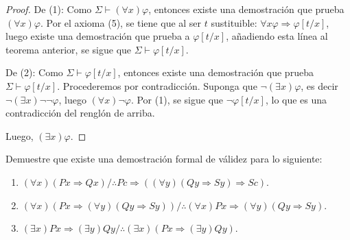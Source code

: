 \documentclass[12pt]{report}
\theoremstyle{largebreak}
\begin{document}
    \begin{proof}
        De (1): Como $\Sigma\vdash(\forall x)\varphi$, entonces existe una demostración que prueba $(\forall x)\varphi$. Por el axioma (5), se tiene que al ser $t$ sustituible: $\forall x\varphi\Rightarrow\varphi\left[t/x \right]$, luego existe una demostración que prueba a $\varphi\left[t/x \right]$, añadiendo esta línea al teorema anterior, se sigue que $\Sigma\vdash\varphi\left[t/x \right]$.

        De (2): Como $\Sigma\vdash\varphi[t/x]$, entonces existe una demostración que prueba $\Sigma\vdash\varphi[t/x]$. Procederemos por contradicción. Suponga que $\neg(\exists x)\varphi$, es decir $\neg(\exists x)\neg\neg\varphi$, luego $(\forall x)\neg\varphi$. Por (1), se sigue que $\neg\varphi[t/x]$, lo que es una contradicción del renglón de arriba.

        Luego, $(\exists x)\varphi$.
    \end{proof}

    \begin{excer}
        Demuestre que existe una demostración formal de válidez para lo siguiente:
        \begin{enumerate}
            \item $(\forall x)(Px\Rightarrow Qx)/\therefore Pc\Rightarrow((\forall y)(Qy\Rightarrow Sy)\Rightarrow Sc)$.
            \item $(\forall x)(Px\Rightarrow(\forall y)(Qy\Rightarrow Sy))/\therefore (\forall x)Px\Rightarrow(\forall y)(Qy\Rightarrow Sy)$.
            \item $(\exists x)Px\Rightarrow (\exists y)Qy/\therefore (\exists x)(Px\Rightarrow (\exists y)Qy)$.
        \end{enumerate}
    \end{excer}
\end{document}
